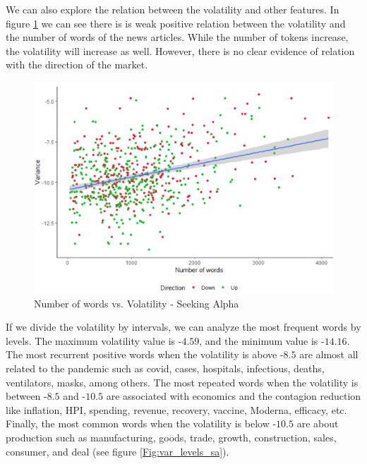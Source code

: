 \documentclass[a4paper, 12pt]{report}
\begin{document}
    
    We can also explore the relation between the volatility and other features. In figure \ref{Fig:var_vs_tokens} we can see there is is weak positive relation between the volatility and the number of words of the news articles. While the number of tokens increase, the volatility will increase as well. However, there is no clear evidence of relation with the direction of the market.
    
    \begin{figure}[H]
    \centering
    \includegraphics[scale=0.75]{graphs/Seeking_Alpha/var_vs_tokens.png}
    \caption{Number of words vs. Volatility - Seeking Alpha}
    \label{Fig:var_vs_tokens}
    \end{figure}
    
    
    If we divide the volatility by intervals, we can analyze the most frequent words by levels. The maximum volatility value is -$4.59$, and the minimum value is -$14.16$. The most recurrent positive words when the volatility is above -$8.5$ are almost all related to the pandemic such as covid, cases, hospitals, infectious, deaths, ventilators, masks, among others. The most repeated words when the volatility is between -$8.5$ and -$10.5$ are associated with economics and the contagion reduction like inflation, HPI, spending, revenue, recovery, vaccine, Moderna, efficacy, etc. Finally, the most common words when the volatility is below -$10.5$ are about production such as manufacturing, goods, trade, growth, construction, sales, consumer, and deal (see figure \ref{Fig:var_levels_sa}).
    
\end{document}
